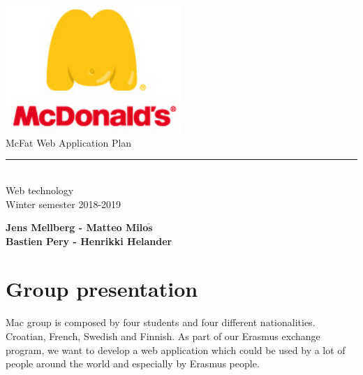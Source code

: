 \documentclass[12pt]{article}
\begin{document}
\begin{titlepage}
        \begin{center}
            \includegraphics[width=0.5\textwidth]{./Pictures/mcdonalds-fat-logo.jpg}\\
            \vspace{1cm}
            \Large McFat Web Application Plan\\
            \rule{5cm}{.5pt}\\
            \vspace{0.6cm}
            {\Large Web technology}\\
            \vspace{0.1cm}
            {\Large Winter semester 2018-2019} \\
            \vspace{3em}

            \textbf{Jens Mellberg - Matteo Milo$\mathbf{\check{s}}$}\\
            \textbf{Bastien Pery - Henrikki Helander}
        \end{center}

    \end{titlepage}

    \renewcommand{\contentsname}{\color{color_section}\\Table of contents}
    \tableofcontents

    \newpage

    {\color{color_section}\section{Group presentation}}
        Mac group is composed by four students and four different nationalities.
        Croatian, French, Swedish and Finnish. As part of our Erasmus exchange program, 
        we want to develop a web application which could be used by a lot 
        of people around the world and especially by Erasmus people.
        
\end{document}
